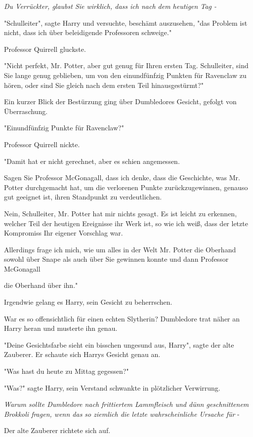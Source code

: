 {\emph{Du Verrückter, glaubst Sie wirklich, dass ich nach dem heutigen Tag -}

"Schulleiter", sagte Harry und versuchte, beschämt auszusehen, "das Problem ist nicht, dass ich über beleidigende Professoren schweige."

Professor Quirrell gluckste.

"Nicht perfekt, Mr. Potter, aber gut genug für Ihren ersten Tag. Schulleiter, sind Sie lange genug geblieben, um von den einundfünfzig Punkten für Ravenclaw zu hören, oder sind Sie gleich nach dem ersten Teil hinausgestürmt?"

Ein kurzer Blick der Bestürzung ging über Dumbledores Gesicht, gefolgt von Überraschung.

"Einundfünfzig Punkte für Ravenclaw?"

Professor Quirrell nickte.

"Damit hat er nicht gerechnet, aber es schien angemessen.

Sagen Sie Professor McGonagall, dass ich denke, dass die Geschichte, was Mr. Potter durchgemacht hat, um die verlorenen Punkte zurückzugewinnen, genauso gut geeignet ist, ihren Standpunkt zu verdeutlichen.

Nein, Schulleiter, Mr. Potter hat mir nichts gesagt. Es ist leicht zu erkennen, welcher Teil der heutigen Ereignisse ihr Werk ist, so wie ich weiß, dass der letzte Kompromiss Ihr eigener Vorschlag war.

Allerdings frage ich mich, wie um alles in der Welt Mr. Potter die Oberhand sowohl über Snape als auch über Sie gewinnen konnte und dann Professor McGonagall

die Oberhand über ihn."

Irgendwie gelang es Harry, sein Gesicht zu beherrschen.

War es so offensichtlich für einen echten Slytherin? Dumbledore trat näher an Harry heran und musterte ihn genau.

"Deine Gesichtsfarbe sieht ein bisschen ungesund aus, Harry", sagte der alte Zauberer. Er schaute sich Harrys Gesicht genau an.

"Was hast du heute zu Mittag gegessen?"

"Was?" sagte Harry, sein Verstand schwankte in plötzlicher Verwirrung.

\emph{Warum sollte Dumbledore nach frittiertem Lammfleisch und dünn geschnittenem Brokkoli fragen, wenn das so ziemlich die letzte wahrscheinliche Ursache für} -

Der alte Zauberer richtete sich auf.

}
